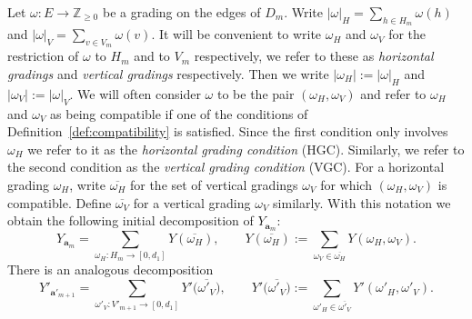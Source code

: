 \documentclass{amsart}
\newcommand{\bfa}{\mathbf{a}}
\newcommand{\ZZ}{\mathbb{Z}}
\begin{document}
Let $\omega:E\to\ZZ_{\ge0}$ be a grading on the edges of $D_m$.  Write $|\omega|_H=\sum\limits_{h\in H_m} \omega(h)$ and $|\omega|_V=\sum\limits_{v\in V_m} \omega(v)$.  It will be convenient to write $\omega_H$ and $\omega_V$ for the restriction of $\omega$ to $H_m$ and to $V_m$ respectively, we refer to these as \emph{horizontal gradings} and \emph{vertical gradings} respectively.  Then we write $|\omega_H|:=|\omega|_H$ and $|\omega_V|:=|\omega|_V$.  We will often consider $\omega$ to be the pair $(\omega_H,\omega_V)$ and refer to $\omega_H$ and $\omega_V$ as being compatible if one of the conditions of Definition~\ref{def:compatibility} is satisfied.  Since the first condition only involves $\omega_H$ we refer to it as the \emph{horizontal grading condition} (HGC).  Similarly, we refer to the second condition as the \emph{vertical grading condition} (VGC).  For a horizontal grading $\omega_H$, write $\overline{\omega_H}$ for the set of vertical gradings $\omega_V$ for which $(\omega_H,\omega_V)$ is compatible.  Define $\overline{\omega_V}$ for a vertical grading $\omega_V$ similarly.  With this notation we obtain the following initial decomposition of $Y_{\bfa_m}$:
\begin{equation}\label{eq:Y decomposition}
  Y_{\bfa_m}=\sum_{\omega_H:H_m\to[0,d_1]}Y(\overline{\omega_H}),\qquad Y(\overline{\omega_H}):=\sum_{\omega_V\in\overline{\omega_H}}Y(\omega_H,\omega_V).
\end{equation}
There is an analogous decomposition
\begin{equation}\label{eq:Y prime decomposition}
  Y'_{\bfa'_{m+1}}=\sum_{\omega'_V:V'_{m+1}\to[0,d_1]}Y'\Big(\overline{\omega'_V}\Big),\qquad Y'\Big(\overline{\omega'_V}\Big):=\sum_{\omega'_H\in\overline{\omega'_V}}Y'(\omega'_H,\omega'_V).
\end{equation}
\end{document}
